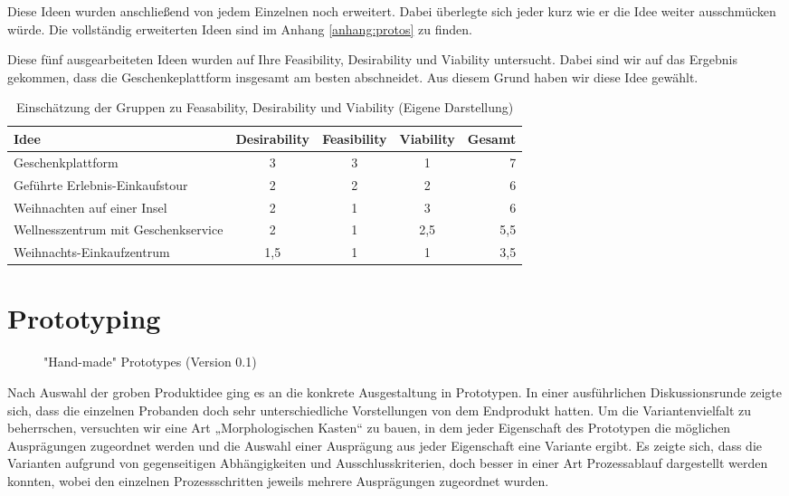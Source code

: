\documentclass[12pt,ngerman, fleqn]{book} %
\begin{document}
Diese Ideen wurden anschließend von jedem Einzelnen noch erweitert. Dabei überlegte sich jeder kurz wie er die Idee weiter ausschmücken würde. Die vollständig erweiterten Ideen sind im Anhang \ref{anhang:protos} zu finden. 

Diese fünf ausgearbeiteten Ideen wurden auf Ihre Feasibility, Desirability und Viability untersucht. Dabei sind wir auf das Ergebnis gekommen, dass die Geschenkeplattform insgesamt am besten abschneidet. Aus diesem Grund haben wir diese Idee gewählt.

\begin{table}[ht]
\caption{Einschätzung der Gruppen zu Feasability, Desirability und Viability (Eigene Darstellung)}
\begin{center}
\begin{tabular}{l*{3}{c}r}
Idee & Desirability & Feasibility & Viability & Gesamt\\
\hline
Geschenkplattform & 3  & 3 & 1 & 7\\
Geführte Erlebnis-Einkaufstour & 2  & 2 & 2 & 6 \\
Weihnachten auf einer Insel & 2  & 1 & 3 & 6\\
Wellnesszentrum mit Geschenkservice & 2 & 1 & 2,5 & 5,5\\
Weihnachts-Einkaufzentrum & 1,5 & 1 & 1 & 3,5\\
\hline
\end{tabular}
\end{center}
\label{tab:feasability}
\end{table}%

\chapter{Prototyping}

\begin{figure}[ht]
    \centering
    \caption{"Hand-made" Prototypes (Version 0.1)}
    \label{fig:peter}
\end{figure}

Nach Auswahl der groben Produktidee ging es an die konkrete Ausgestaltung in Prototypen. In einer ausführlichen Diskussionsrunde zeigte sich, dass die einzelnen Probanden doch sehr unterschiedliche Vorstellungen von dem Endprodukt hatten. Um die Variantenvielfalt zu beherrschen, versuchten wir eine Art „Morphologischen Kasten“ zu bauen, in dem jeder Eigenschaft des Prototypen die möglichen Ausprägungen zugeordnet werden und die Auswahl einer Ausprägung aus jeder Eigenschaft eine Variante ergibt. Es zeigte sich, dass die Varianten aufgrund von gegenseitigen Abhängigkeiten und Ausschlusskriterien, doch besser in einer Art Prozessablauf dargestellt werden konnten, wobei den einzelnen Prozessschritten jeweils mehrere Ausprägungen zugeordnet wurden.\\
\end{document}
